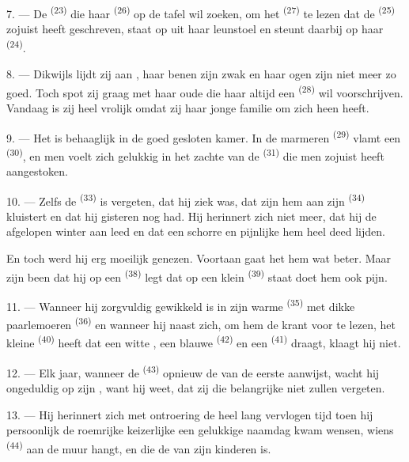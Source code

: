 7. --- De  \textsuperscript{(23)} die haar
 \textsuperscript{(26)} op de tafel wil zoeken, om het
 \textsuperscript{(27)} te lezen dat de 
\textsuperscript{(25)} zojuist heeft geschreven, staat op uit haar leunstoel en steunt daarbij
op haar  \textsuperscript{(24)}.

8. --- Dikwijls lijdt zij aan ,
haar benen zijn zwak en haar ogen zijn niet meer zo goed. Toch spot zij graag met haar oude
 die haar altijd een
 \textsuperscript{(28)} wil voorschrijven. Vandaag is zij heel
vrolijk omdat zij haar jonge familie om zich heen heeft.

9. --- Het is behaaglijk in de goed gesloten kamer. In de marmeren
 \textsuperscript{(29)} vlamt een 
\textsuperscript{(30)}, en men voelt zich gelukkig in het zachte  van de
 \textsuperscript{(31)} die men zojuist heeft aangestoken.

\VUsaut{4.2mm}
\VUsaut{3.0mm}

10. --- Zelfs de  \textsuperscript{(33)} is vergeten, dat hij ziek was, dat
zijn  hem aan zijn  \textsuperscript{(34)} kluistert en
dat hij gisteren nog  had. Hij herinnert zich niet meer, dat hij de
afgelopen winter aan
 leed en dat een schorre en pijnlijke  hem
heel deed lijden.

En toch werd hij erg moeilijk genezen. Voortaan gaat het hem wat beter. Maar zijn been dat
hij op een  \textsuperscript{(38)} legt dat op een klein 
\textsuperscript{(39)} staat doet hem ook pijn.

11. --- Wanneer hij zorgvuldig gewikkeld is in zijn warme 
\textsuperscript{(35)} met dikke paarlemoeren  \textsuperscript{(36)} en
wanneer hij naast zich, om hem de krant voor te lezen, het kleine 
\textsuperscript{(40)} heeft dat een witte
, een blauwe  \textsuperscript{(42)} en een
 \textsuperscript{(41)} draagt, klaagt hij niet.

12. --- Elk jaar, wanneer de  \textsuperscript{(43)} opnieuw de
 van de eerste  aanwijst, wacht hij ongeduldig op
zijn , want hij weet, dat zij die belangrijke
 niet zullen vergeten.

13. --- Hij herinnert zich met ontroering de heel lang vervlogen tijd toen hij persoonlijk de
roemrijke keizerlijke  een gelukkige naamdag kwam wensen, wiens
 \textsuperscript{(44)} aan de muur hangt, en die de 
van zijn kinderen is.
\VUsaut{6.0mm}
\VUfilet{22mm}

